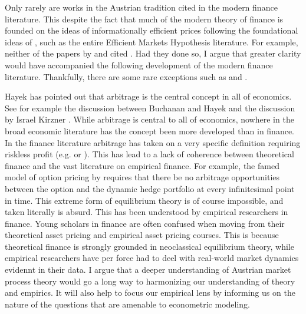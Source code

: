 \documentclass[11pt,]{article}
\begin{document}
Only rarely are works in the Austrian tradition cited in the modern
finance literature. This despite the fact that much of the modern theory
of finance is founded on the ideas of informationally efficient prices
following the foundational ideas of \citet{Hayek1945}, such as the
entire Efficient Markets Hypothesis literature. For example, neither of
the papers by \citet{Samuelson1965} and \citet{Fama1970} cited
\citet{Hayek1945}. Had they done so, I argue that greater clarity would
have accompanied the following development of the modern finance
literature. Thankfully, there are some rare exceptions such as
\citet{Grossman1989} and \citet{Vives2010}.

Hayek has pointed out that arbitrage is the central concept in all of
economics. See for example the discussion between Buchanan and Hayek
\citep{BuchananHayek} and the discussion by Israel Kirzner
\citep{KirznerYT1}. While arbitrage is central to all of economics,
nowhere in the broad economic literature has the concept been more
developed than in finance. In the finance literature arbitrage has taken
on a very specific definition requiring riskless profit (e.g.
\citep{Varian1989} or \citep{DybvigRoss1989}). This has lead to a lack
of coherence between theoretical finance and the vast literature on
empirical finance. For example, the famed model of option pricing by
\citet{BlackScholes1973} requires that there be no arbitrage
opportunities between the option and the dynamic hedge portfolio at
every infinitesimal point in time. This extreme form of equilibrium
theory is of course impossible, and taken literally is absurd. This has
been understood by empirical researchers in finance. Young scholars in
finance are often confused when moving from their theoretical asset
pricing and empirical asset pricing courses. This is because theoretical
finance is strongly grounded in neoclassical equilibrium theory, while
empirical researchers have per force had to deel with real-world market
dynamics evidennt in their data. I argue that a deeper understanding of
Austrian market process theory would go a long way to harmonizing our
understanding of theory and empirics. It will also help to focus our
empirical lens by informing us on the nature of the questions that are
amenable to econometric modeling.
\end{document}
